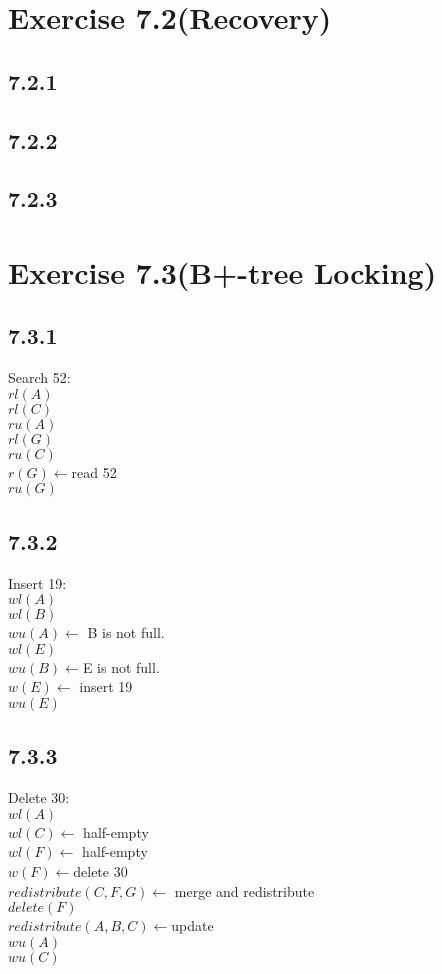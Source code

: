 \documentclass[12pt]{article}
\begin{document}
	\section*{Exercise 7.2(Recovery)}
	\subsection*{7.2.1}
		
	\subsection*{7.2.2}
	
	\subsection*{7.2.3}
		
		
		
	\section*{Exercise 7.3(B+-tree Locking)}
	\subsection*{7.3.1}
	Search 52:\\
	$rl(A)$\\
	$rl(C)$\\
	$ru(A)$\\
	$rl(G)$\\
	$ru(C)$\\
	$r(G)\leftarrow $read 52 \\
	$ru(G)$\\
	\subsection*{7.3.2}
	Insert 19:\\
	$wl(A)$\\
	$wl(B)$\\
	$wu(A)\leftarrow$ B is not full.\\
	$wl(E)$\\
	$wu(B)\leftarrow $E is not full.\\
	$w(E)\leftarrow$ insert 19\\
	$wu(E)$\\
	
	\subsection*{7.3.3}
	Delete 30:\\
	$wl(A)$\\
	$wl(C)\leftarrow$ half-empty\\
	$wl(F)\leftarrow$ half-empty\\
	$w(F)\leftarrow$delete 30\\
	$redistribute(C,F,G)\leftarrow$ merge and redistribute\\
	$delete(F)$\\
	$redistribute(A,B,C)\leftarrow$update\\
	$wu(A)$\\
	$wu(C)$\\
	
\end{document}
